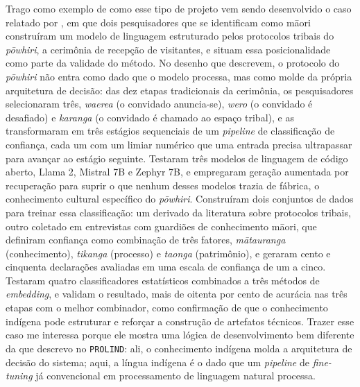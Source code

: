 Trago como exemplo de como esse tipo de projeto vem sendo desenvolvido o caso relatado por \textcite{Shedlock2025Indigenous}, em que dois pesquisadores que se identificam como māori construíram um modelo de linguagem estruturado pelos protocolos tribais do \textit{pōwhiri}, a cerimônia de recepção de visitantes, e situam essa posicionalidade como parte da validade do método. No desenho que descrevem, o protocolo do \textit{pōwhiri} não entra como dado que o modelo processa, mas como molde da própria arquitetura de decisão: das dez etapas tradicionais da cerimônia, os pesquisadores selecionaram três, \textit{waerea} (o convidado anuncia-se), \textit{wero} (o convidado é desafiado) e \textit{karanga} (o convidado é chamado ao espaço tribal), e as transformaram em três estágios sequenciais de um \textit{pipeline} de classificação de confiança, cada um com um limiar numérico que uma entrada precisa ultrapassar para avançar ao estágio seguinte. Testaram três modelos de linguagem de código aberto, Llama 2, Mistral 7B e Zephyr 7B, e empregaram geração aumentada por recuperação para suprir o que nenhum desses modelos trazia de fábrica, o conhecimento cultural específico do \textit{pōwhiri}. Construíram dois conjuntos de dados para treinar essa classificação: um derivado da literatura sobre protocolos tribais, outro coletado em entrevistas com guardiões de conhecimento māori, que definiram confiança como combinação de três fatores, \textit{mātauranga} (conhecimento), \textit{tikanga} (processo) e \textit{taonga} (patrimônio), e geraram cento e cinquenta declarações avaliadas em uma escala de confiança de um a cinco. Testaram quatro classificadores estatísticos combinados a três métodos de \textit{embedding}, e validam o resultado, mais de oitenta por cento de acurácia nas três etapas com o melhor combinador, como confirmação de que o conhecimento indígena pode estruturar e reforçar a construção de artefatos técnicos. Trazer esse caso me interessa porque ele mostra uma lógica de desenvolvimento bem diferente da que descrevo no \texttt{PROLIND}: ali, o conhecimento indígena molda a arquitetura de decisão do sistema; aqui, a língua indígena é o dado que um \textit{pipeline} de \textit{fine-tuning} já convencional em processamento de linguagem natural processa.

